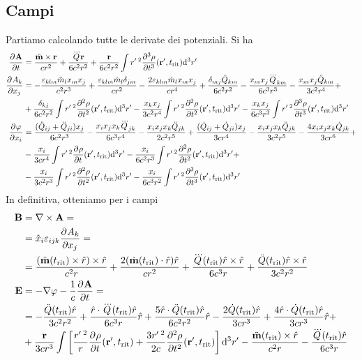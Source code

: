 \documentclass[a4paper,11pt]{article}
\renewcommand{\d}{\mathrm{d}}
\renewcommand{\vec}[1]{\mathbf{#1}}
\renewcommand{\t}{t_{\mathrm{rit}}}
\begin{document}
\subsection{Campi}
Partiamo calcolando tutte le derivate dei potenziali. Si ha
\begin{align*}
	\pder{\vec{A}}{t}&=\frac{\ddot{\vec{m}}\times\vec{r}}{cr^2}+\frac{\dddot{Q}\vec{r}}{6c^2r^2}+\frac{\vec{r}}{6c^2r^2}\int r'\,^2\pder[3]{\rho}{t}(\vec{r}',\t)\d^3r'\\
	\pder{A_k}{x_j}&=-\frac{\varepsilon_{klm}\ddot{m}_lx_mx_j}{c^2r^3}+\frac{\varepsilon_{klm}\dot{m}_l\delta_{jm}}{cr^2}-\frac{2\varepsilon_{klm}\dot{m}_lx_mx_j}{cr^4}+\frac{\delta_{mj}\ddot{Q}_{km}}{6c^2r^2}-\frac{x_mx_j\dddot{Q}_{km}}{6c^3r^3}-\frac{x_mx_j\ddot{Q}_{km}}{3c^2r^4}+\\&+\frac{\delta_{kj}}{6c^2r^2}\int r'\,^2\pder[2]{\rho}{t}(\vec{r}',\t)\d^3r'
	-\frac{x_kx_j}{3c^2r^4}\int r'\,^2\pder[2]{\rho}{t}(\vec{r}',\t)\d^3r'-\frac{x_kx_j}{6c^3r^3}\int r'\,^2\pder[3]{\rho}{t}(\vec{r}',\t)\d^3r'\\
	\pder{\varphi}{x_i}&=\frac{(\ddot{Q}_{ij}+\ddot{Q}_{ji})x_j}{6c^2r^3}-\frac{x_ix_jx_k\dddot{Q}_{jk}}{6c^3r^4}-\frac{x_ix_jx_k\ddot{Q}_{jk}}{2c^2r^5}+\frac{(\dot{Q}_{ij}+\dot{Q}_{ji})x_j}{3cr^4}-\frac{x_ix_jx_k\ddot{Q}_{jk}}{3c^2r^5}-\frac{4x_ix_jx_k\dot{Q}_{jk}}{3cr^6}+\\&-\frac{x_i}{3cr^4}\int r'\,^2\pder{\rho}{t}(\vec{r}',\t)\d^3r'-\frac{x_i}{6c^2r^3}\int r'\,^2\pder[2]{\rho}{t}(\vec{r}',\t)\d^3r'+\\&-\frac{x_i}{3c^2r^3}\int r'\,^2\pder[2]{\rho}{t}(\vec{r}',\t)\d^3r'-\frac{x_i}{6c^3r^2}\int r'\,^2\pder[3]{\rho}{t}(\vec{r}',\t)\d^3r'
\end{align*}
In definitiva, otteniamo per i campi
\begin{align*}
	\vec{B}&=\nabla\times\vec{A}=\\&=\hat{x}_i\varepsilon_{ijk}\pder{A_k}{x_j}=\\&=\frac{(\ddot{\vec{m}}(\t)\times\hat{r})\times\hat{r}}{c^2r}+\frac{2(\dot{\vec{m}}(\t)\cdot\hat{r})\hat{r}}{cr^2}+\frac{\dddot{Q}(\t)\hat{r}\times\hat{r}}{6c^3r}+\frac{\ddot{Q}(\t)\hat{r}\times\hat{r}}{3c^2r^2}\\\vec{E}&=-\nabla\varphi-\frac{1}{c}\pder{\vec{A}}{t}=\\&=-\frac{\ddot{Q}(\t)\hat{r}}{3c^2r^2}+\frac{\hat{r}\cdot\dddot{Q}(\t)\hat{r}}{6c^3r}\hat{r}+\frac{5\hat{r}\cdot\ddot{Q}(\t)\hat{r}}{6c^2r^2}\hat{r}-\frac{2\dot{Q}(\t)\hat{r}}{3cr^3}+\frac{4\hat{r}\cdot\dot{Q}(\t)\hat{r}}{3cr^3}\hat{r}+\\&+\frac{\vec{r}}{3cr^3}\int\left[\frac{r'\,^2}{r}\pder{\rho}{t}(\vec{r}',\t)+\frac{3r'\,^2}{2c}\pder[2]{\rho}{t}(\vec{r}',\t)\right]\d^3r'-\frac{\ddot{\vec{m}}(\t)\times\hat{r}}{c^2r}-\frac{\dddot{Q}(\t)\hat{r}}{6c^3r}
\end{align*}
\end{document}
